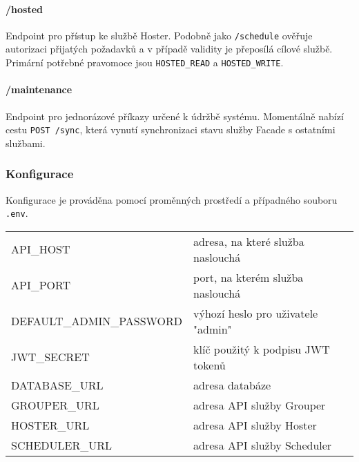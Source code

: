 \paragraph*{/hosted}
Endpoint pro přístup ke službě Hoster. Podobně jako \lstinline|/schedule| ověřuje autorizaci přijatých požadavků a v případě validity je přeposílá cílové službě. Primární potřebné pravomoce jsou \lstinline{HOSTED_READ} a \lstinline{HOSTED_WRITE}.

\paragraph*{/maintenance}
Endpoint pro jednorázové příkazy určené k údržbě systému. Momentálně nabízí cestu \lstinline|POST /sync|, která vynutí synchronizaci stavu služby Facade s ostatními službami.

\subsubsection{Konfigurace}
Konfigurace je prováděna pomocí proměnných prostředí a případného souboru \lstinline{.env}.
\begin{table}[h]
    \begin{tabular}{ll}
        API\_HOST & adresa, na které služba naslouchá \\
        API\_PORT & port, na kterém služba naslouchá \\
        DEFAULT\_ADMIN\_PASSWORD & výhozí heslo pro uživatele "admin" \\
        JWT\_SECRET & klíč použitý k podpisu JWT tokenů \\
        DATABASE\_URL & adresa databáze \\
        GROUPER\_URL & adresa API služby Grouper \\
        HOSTER\_URL & adresa API služby Hoster \\
        SCHEDULER\_URL & adresa API služby Scheduler \\
    \end{tabular}
\end{table}